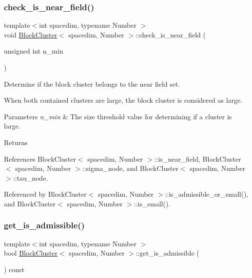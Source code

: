 \mbox{\label{classBlockCluster_a44900c760eac0578f700fa678ef4e416}} 
\subsubsection{\texorpdfstring{check\+\_\+is\+\_\+near\+\_\+field()}{check\_is\_near\_field()}}
{\footnotesize\ttfamily template$<$int spacedim, typename Number $>$ \\
void \hyperlink{classBlockCluster}{Block\+Cluster}$<$ spacedim, Number $>$\+::check\+\_\+is\+\_\+near\+\_\+field (\begin{DoxyParamCaption}\item[{unsigned int}]{n\+\_\+min }\end{DoxyParamCaption})}

Determine if the block cluster belongs to the near field set.

When both contained clusters are large, the block cluster is considered as large. 
\begin{DoxyParams}{Parameters}
{\em n\+\_\+min} & The size threshold value for determining if a cluster is large. \\
\hline
\end{DoxyParams}
\begin{DoxyReturn}{Returns}

\end{DoxyReturn}


References Block\+Cluster$<$ spacedim, Number $>$\+::is\+\_\+near\+\_\+field, Block\+Cluster$<$ spacedim, Number $>$\+::sigma\+\_\+node, and Block\+Cluster$<$ spacedim, Number $>$\+::tau\+\_\+node.



Referenced by Block\+Cluster$<$ spacedim, Number $>$\+::is\+\_\+admissible\+\_\+or\+\_\+small(), and Block\+Cluster$<$ spacedim, Number $>$\+::is\+\_\+small().

\mbox{\label{classBlockCluster_a792554d843db2dfb996a1d1086e9178b}} 
\subsubsection{\texorpdfstring{get\+\_\+is\+\_\+admissible()}{get\_is\_admissible()}}
{\footnotesize\ttfamily template$<$int spacedim, typename Number $>$ \\
bool \hyperlink{classBlockCluster}{Block\+Cluster}$<$ spacedim, Number $>$\+::get\+\_\+is\+\_\+admissible (\begin{DoxyParamCaption}{ }\end{DoxyParamCaption}) const}

